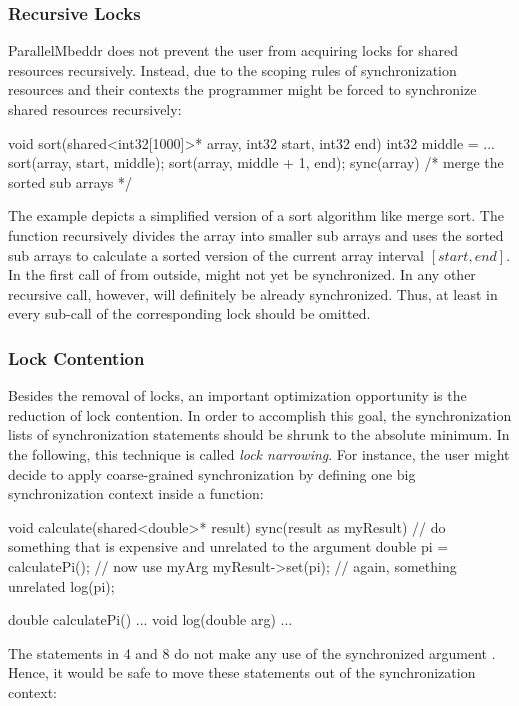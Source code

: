 \subsubsection{Recursive Locks}
ParallelMbeddr does not prevent the user from acquiring locks for shared resources recursively. Instead, due to the scoping rules of synchronization resources and their contexts the programmer might be forced to synchronize shared resources recursively:
\begin{ccode}
void sort(shared<int32[1000]>* array, int32 start, int32 end)
int32 middle = ...
sort(array, start, middle);
sort(array, middle + 1, end);
sync(array) { /* merge the sorted sub arrays */ }
\end{ccode}
The example depicts a simplified version of a sort algorithm like merge sort. The function  recursively divides the array into smaller sub arrays and uses the sorted sub arrays to calculate a sorted version of the current array interval $[start, end]$. In the first call of  from outside,  might not yet be synchronized. In any other recursive call, however,  will definitely be already synchronized. Thus, at least in every sub-call of  the corresponding lock should be omitted.

\subsubsection{Lock Contention}
Besides the removal of locks, an important optimization opportunity is the reduction of lock contention. In order to accomplish this goal, the synchronization lists of synchronization statements should be shrunk to the absolute minimum. In the following, this technique is called \textit{lock narrowing}. For instance, the user might decide to apply coarse-grained synchronization by defining one big synchronization context inside a function:

\begin{ccode}
void calculate(shared<double>* result) {
  sync(result as myResult) {
    // do something that is expensive and unrelated to the argument
    double pi = calculatePi();
    // now use myArg
    myResult->set(pi);
    // again, something unrelated
    log(pi);
  }
}

double calculatePi() {...}
void log(double arg) {...}
\end{ccode}

The statements in 4 and 8 do not make any use of the synchronized argument . Hence, it would be safe to move these statements out of the synchronization context:


